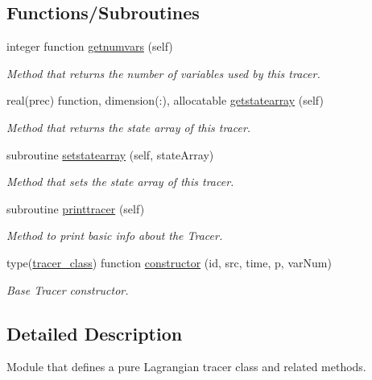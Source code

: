 \subsection*{Functions/\+Subroutines}
\begin{DoxyCompactItemize}
\item 
integer function \mbox{\hyperlink{namespacetracerbase__mod_a0be55b393be0846cbbe6be9feb3bb539}{getnumvars}} (self)
\begin{DoxyCompactList}\small\item\em Method that returns the number of variables used by this tracer. \end{DoxyCompactList}\item 
real(prec) function, dimension(\+:), allocatable \mbox{\hyperlink{namespacetracerbase__mod_adbdd85bd57f1a9debbe7b682099afb1d}{getstatearray}} (self)
\begin{DoxyCompactList}\small\item\em Method that returns the state array of this tracer. \end{DoxyCompactList}\item 
subroutine \mbox{\hyperlink{namespacetracerbase__mod_af85802e927b07e777b94375550246c16}{setstatearray}} (self, state\+Array)
\begin{DoxyCompactList}\small\item\em Method that sets the state array of this tracer. \end{DoxyCompactList}\item 
subroutine \mbox{\hyperlink{namespacetracerbase__mod_ae320123e374df674769dbd48ba5ef46f}{printtracer}} (self)
\begin{DoxyCompactList}\small\item\em Method to print basic info about the Tracer. \end{DoxyCompactList}\item 
type(\mbox{\hyperlink{structtracerbase__mod_1_1tracer__class}{tracer\+\_\+class}}) function \mbox{\hyperlink{namespacetracerbase__mod_acf861b7ca360dcad1331ca85c50853a6}{constructor}} (id, src, time, p, var\+Num)
\begin{DoxyCompactList}\small\item\em Base Tracer constructor. \end{DoxyCompactList}\end{DoxyCompactItemize}


\subsection{Detailed Description}
Module that defines a pure Lagrangian tracer class and related methods. 

